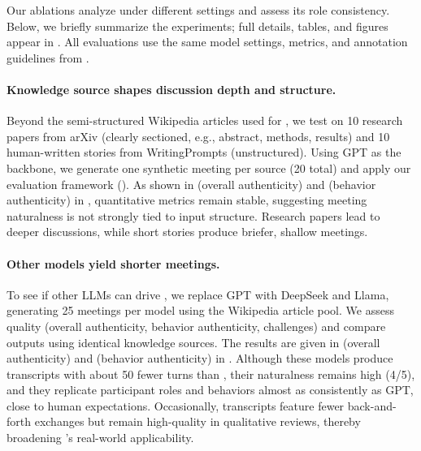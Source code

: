 \label{sec:ablation}
Our ablations analyze \pipeline{} under different settings and assess its role consistency.
Below, we briefly summarize the experiments; full details, tables, and figures appear in .
All evaluations use the same model settings, metrics, and annotation guidelines from .


\paragraph{Knowledge source shapes discussion depth and structure.} 
Beyond the semi-structured Wikipedia articles used for \dataset{}, we test \pipeline{} on 10 research papers from arXiv \cite{CohanDKB18} (clearly sectioned, e.g., abstract, methods, results) and 10 human-written stories from WritingPrompts \cite{FanLD18a} (unstructured).
Using GPT as the backbone, we generate one synthetic meeting per source (20 total) and apply our evaluation framework ().
As shown in  (overall authenticity) and  (behavior authenticity) in , quantitative metrics remain stable, suggesting meeting naturalness is not strongly tied to input structure. 
Research papers lead to deeper discussions, while short stories produce briefer, shallow meetings.



\paragraph{Other models yield shorter meetings.} 
To see if other LLMs can drive \pipeline{}, we replace GPT with DeepSeek and Llama, generating 25 meetings per model using the \dataset{} Wikipedia article pool.
We assess quality (overall authenticity, behavior authenticity, challenges) and compare outputs using identical knowledge sources.
The results are given in  (overall authenticity) and  (behavior authenticity) in .
Although these models produce transcripts with about 50 fewer turns than \dataset{}, their naturalness remains high (4/5), and they replicate participant roles and behaviors almost as consistently as GPT, close to human expectations.
Occasionally, transcripts feature fewer back-and-forth exchanges but remain high-quality in qualitative reviews, thereby broadening \pipeline{}’s real-world applicability.

